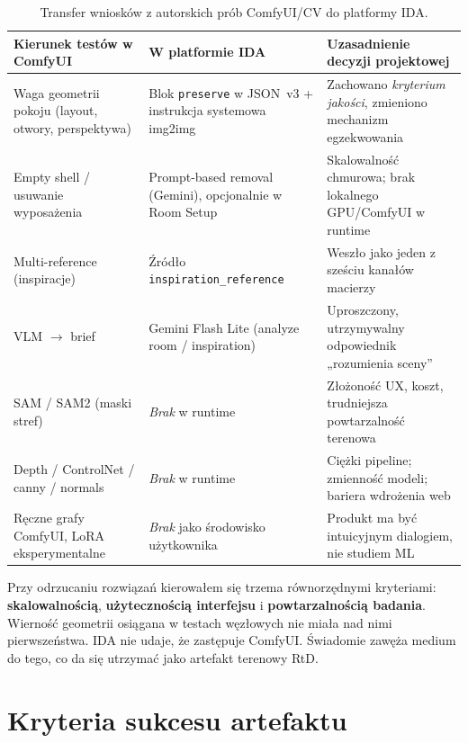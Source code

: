 \begin{table}[htbp]
  \centering
  \caption{Transfer wniosków z autorskich prób ComfyUI/CV do platformy IDA.}
  \label{tab:ch07:comfyui-transfer}
  \begin{tabular}{@{}p{}p{}p{}@{}}
    \toprule
    Kierunek testów w ComfyUI & W platformie IDA & Uzasadnienie decyzji projektowej \\
    \midrule
    Waga geometrii pokoju (layout, otwory, perspektywa) &
    Blok \texttt{preserve} w JSON~v3 + instrukcja systemowa img2img &
    Zachowano \emph{kryterium jakości}, zmieniono mechanizm egzekwowania \\
    \addlinespace
    Empty shell / usuwanie wyposażenia &
    Prompt-based removal (Gemini), opcjonalnie w Room Setup &
    Skalowalność chmurowa; brak lokalnego GPU/ComfyUI w runtime \\
    \addlinespace
    Multi-reference (inspiracje) &
    Źródło \texttt{inspiration\_reference} &
    Weszło jako jeden z sześciu kanałów macierzy \\
    \addlinespace
    VLM $\rightarrow$ brief &
    Gemini Flash Lite (analyze room / inspiration) &
    Uproszczony, utrzymywalny odpowiednik „rozumienia sceny” \\
    \addlinespace
    SAM / SAM2 (maski stref) &
    \emph{Brak} w runtime &
    Złożoność UX, koszt, trudniejsza powtarzalność terenowa \\
    \addlinespace
    Depth / ControlNet / canny / normals &
    \emph{Brak} w runtime &
    Ciężki pipeline; zmienność modeli; bariera wdrożenia web \\
    \addlinespace
    Ręczne grafy ComfyUI, LoRA eksperymentalne &
    \emph{Brak} jako środowisko użytkownika &
    Produkt ma być intuicyjnym dialogiem, nie studiem ML \\
    \bottomrule
  \end{tabular}
\end{table}

Przy odrzucaniu rozwiązań kierowałem się trzema równorzędnymi kryteriami: \textbf{skalowalnością}, \textbf{użytecznością interfejsu} i \textbf{powtarzalnością badania}. Wierność geometrii osiągana w testach węzłowych nie miała nad nimi pierwszeństwa. IDA nie udaje, że zastępuje ComfyUI. Świadomie zawęża medium do tego, co da się utrzymać jako artefakt terenowy RtD.

\section{Kryteria sukcesu artefaktu}
\label{ch07:sec:kryteria}

